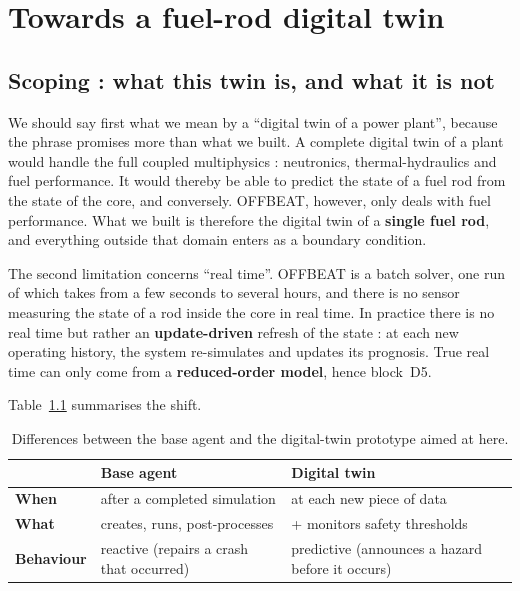\chapter{Towards a fuel-rod digital twin}

\section{Scoping : what this twin is, and what it is not}
\label{sec:cadrage}

We should say first what we mean by a ``digital twin of a power plant'', because
the phrase promises more than what we built. A complete digital twin of a plant
would handle the full coupled
multiphysics : neutronics, thermal-hydraulics and fuel performance. It would
thereby be able to predict the state of a fuel rod from the state of the core,
and conversely. OFFBEAT, however, only deals with fuel performance. What we built is therefore the digital twin
of a \textbf{single fuel rod}, and everything outside that domain enters as a
boundary condition.

The second limitation concerns ``real time''. OFFBEAT is a batch solver, one run
of which takes from a few seconds to several hours, and there is no sensor
measuring the state of a rod inside the core in real time. In practice there is
no real time but rather an \textbf{update-driven} refresh of the state : at each
new operating history, the system re-simulates and updates its prognosis. True
real time can only come from a \textbf{reduced-order model}, hence block~D5.

Table~\ref{tab:agent-vs-twin} summarises the shift.

\begin{table}[htbp]
\centering
\caption[Base agent versus digital-twin prototype]{Differences between the base
agent and the digital-twin prototype aimed at here.}
\label{tab:agent-vs-twin}
\begin{tabularx}{0.95\textwidth}{@{}lXX@{}}
\toprule
 & \textbf{Base agent} & \textbf{Digital twin}\\
\midrule
\textbf{When} & after a completed simulation & at each new piece of data\\
\textbf{What} & creates, runs, post-processes & + monitors safety thresholds\\
\textbf{Behaviour} & reactive (repairs a crash that occurred) &
  predictive (announces a hazard before it occurs)\\
\bottomrule
\end{tabularx}
\end{table}

